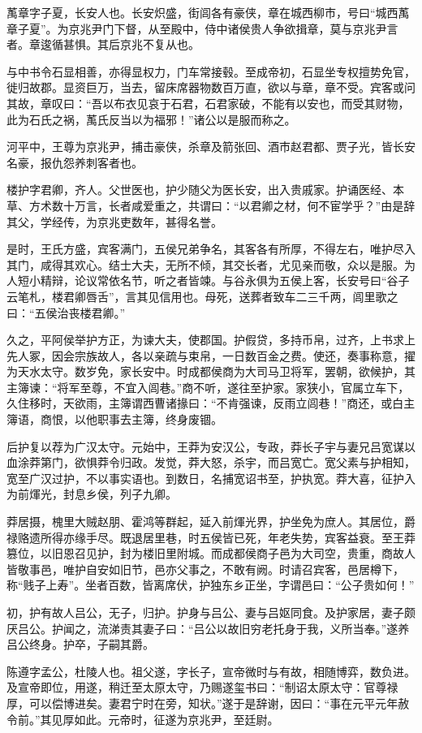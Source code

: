 \documentclass[]{article}
\begin{document}
萭章字子夏，长安人也。长安炽盛，街闾各有豪侠，章在城西柳市，号曰``城西萭章子夏''。为京兆尹门下督，从至殿中，侍中诸侯贵人争欲揖章，莫与京兆尹言者。章逡循甚惧。其后京兆不复从也。

与中书令石显相善，亦得显权力，门车常接毂。至成帝初，石显坐专权擅势免官，徙归故郡。显资巨万，当去，留床席器物数百万直，欲以与章，章不受。宾客或问其故，章叹曰：``吾以布衣见哀于石君，石君家破，不能有以安也，而受其财物，此为石氏之祸，萭氏反当以为福邪！''诸公以是服而称之。

河平中，王尊为京兆尹，捕击豪侠，杀章及箭张回、酒市赵君都、贾子光，皆长安名豪，报仇怨养刺客者也。

楼护字君卿，齐人。父世医也，护少随父为医长安，出入贵戚家。护诵医经、本草、方术数十万言，长者咸爱重之，共谓曰：``以君卿之材，何不宦学乎？''由是辞其父，学经传，为京兆吏数年，甚得名誉。

是时，王氏方盛，宾客满门，五侯兄弟争名，其客各有所厚，不得左右，唯护尽入其门，咸得其欢心。结士大夫，无所不倾，其交长者，尤见亲而敬，众以是服。为人短小精辩，论议常依名节，听之者皆竦。与谷永俱为五侯上客，长安号曰``谷子云笔札，楼君卿唇舌''，言其见信用也。母死，送葬者致车二三千两，闾里歌之曰：``五侯治丧楼君卿。''

久之，平阿侯举护方正，为谏大夫，使郡国。护假贷，多持币帛，过齐，上书求上先人冢，因会宗族故人，各以亲疏与束帛，一日数百金之费。使还，奏事称意，擢为天水太守。数岁免，家长安中。时成都侯商为大司马卫将军，罢朝，欲候护，其主簿谏：``将军至尊，不宜入闾巷。''商不听，遂往至护家。家狭小，官属立车下，久住移时，天欲雨，主簿谓西曹诸掾曰：``不肯强谏，反雨立闾巷！''商还，或白主簿语，商恨，以他职事去主簿，终身废锢。

后护复以荐为广汉太守。元始中，王莽为安汉公，专政，莽长子宇与妻兄吕宽谋以血涂莽第门，欲惧莽令归政。发觉，莽大怒，杀宇，而吕宽亡。宽父素与护相知，宽至广汉过护，不以事实语也。到数日，名捕宽诏书至，护执宽。莽大喜，征护入为前煇光，封息乡侯，列子九卿。

莽居摄，槐里大贼赵朋、霍鸿等群起，延入前煇光界，护坐免为庶人。其居位，爵禄赂遗所得亦缘手尽。既退居里巷，时五侯皆已死，年老失势，宾客益衰。至王莽篡位，以旧恩召见护，封为楼旧里附城。而成都侯商子邑为大司空，贵重，商故人皆敬事邑，唯护自安如旧节，邑亦父事之，不敢有阙。时请召宾客，邑居樽下，称``贱子上寿''。坐者百数，皆离席伏，护独东乡正坐，字谓邑曰：``公子贵如何！''

初，护有故人吕公，无子，归护。护身与吕公、妻与吕妪同食。及护家居，妻子颇厌吕公。护闻之，流涕责其妻子曰：``吕公以故旧穷老托身于我，义所当奉。''遂养吕公终身。护卒，子嗣其爵。

陈遵字孟公，杜陵人也。祖父遂，字长子，宣帝微时与有故，相随博弈，数负进。及宣帝即位，用遂，稍迁至太原太守，乃赐遂玺书曰：``制诏太原太守：官尊禄厚，可以偿博进矣。妻君宁时在旁，知状。''遂于是辞谢，因曰：``事在元平元年赦令前。''其见厚如此。元帝时，征遂为京兆尹，至廷尉。
\end{document}
